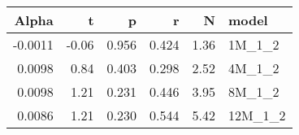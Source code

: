 \begin{table}[ht]
\centering
\begin{tabular}{rrrrrl}
  \hline
Alpha & t & p & r & N & model \\ 
  \hline
-0.0011 & -0.06 & 0.956 & 0.424 & 1.36 & 1M\_1\_2 \\ 
  0.0098 & 0.84 & 0.403 & 0.298 & 2.52 & 4M\_1\_2 \\ 
  0.0098 & 1.21 & 0.231 & 0.446 & 3.95 & 8M\_1\_2 \\ 
  0.0086 & 1.21 & 0.230 & 0.544 & 5.42 & 12M\_1\_2 \\ 
   \hline
\end{tabular}
\end{table}

